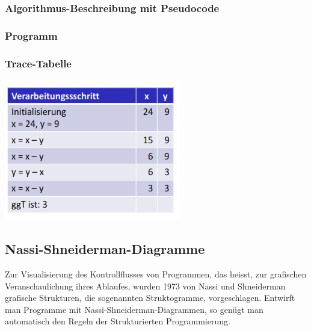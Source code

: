 		\begin{minipage}[t]{9 cm}	
			\subsubsection{Algorithmus-Beschreibung mit Pseudocode }
				
					
				\subsubsection{Programm}
					
							
				\subsubsection{Trace-Tabelle }
					\includegraphics[width=0.58\textwidth]{pics/Euklid_Trace.jpg}
	
		\end{minipage}
		
	\subsection{Nassi-Shneiderman-Diagramme }
		Zur Visualisierung des Kontrollflusses von Programmen, das heisst, zur grafischen Veranschaulichung ihres Ablaufes, wurden 1973 von Nassi und Shneiderman grafische Strukturen, die sogenannten Struktogramme, vorgeschlagen. Entwirft man Programme mit Nassi-Shneiderman-Diagrammen, so genügt man automatisch den Regeln der Strukturierten Programmierung.
		
